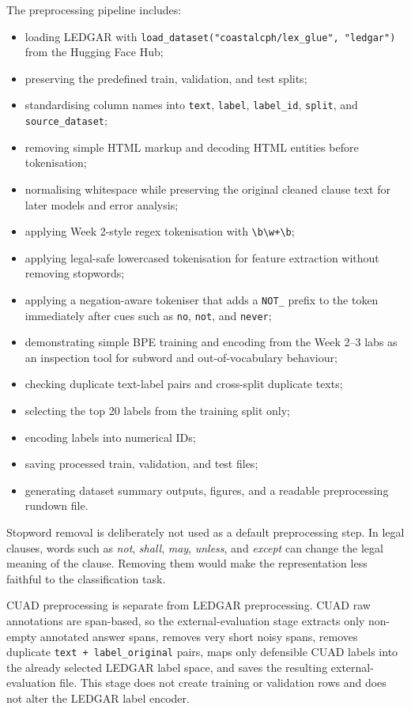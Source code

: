 \documentclass[11pt]{article}
\begin{document}
The preprocessing pipeline includes:

\begin{itemize}[leftmargin=*]
    \item loading LEDGAR with \texttt{load\_dataset("coastalcph/lex\_glue", "ledgar")} from the Hugging Face Hub;
    \item preserving the predefined train, validation, and test splits;
    \item standardising column names into \texttt{text}, \texttt{label}, \texttt{label\_id}, \texttt{split}, and \texttt{source\_dataset};
    \item removing simple HTML markup and decoding HTML entities before tokenisation;
    \item normalising whitespace while preserving the original cleaned clause text for later models and error analysis;
    \item applying Week 2-style regex tokenisation with \texttt{\textbackslash b\textbackslash w+\textbackslash b};
    \item applying legal-safe lowercased tokenisation for feature extraction without removing stopwords;
    \item applying a negation-aware tokeniser that adds a \texttt{NOT\_} prefix to the token immediately after cues such as \texttt{no}, \texttt{not}, and \texttt{never};
    \item demonstrating simple BPE training and encoding from the Week 2--3 labs as an inspection tool for subword and out-of-vocabulary behaviour;
    \item checking duplicate text-label pairs and cross-split duplicate texts;
    \item selecting the top 20 labels from the training split only;
    \item encoding labels into numerical IDs;
    \item saving processed train, validation, and test files;
    \item generating dataset summary outputs, figures, and a readable preprocessing rundown file.
\end{itemize}

Stopword removal is deliberately not used as a default preprocessing step. In legal clauses, words such as \textit{not}, \textit{shall}, \textit{may}, \textit{unless}, and \textit{except} can change the legal meaning of the clause. Removing them would make the representation less faithful to the classification task.

CUAD preprocessing is separate from LEDGAR preprocessing. CUAD raw annotations are span-based, so the external-evaluation stage extracts only non-empty annotated answer spans, removes very short noisy spans, removes duplicate \texttt{text + label\_original} pairs, maps only defensible CUAD labels into the already selected LEDGAR label space, and saves the resulting external-evaluation file. This stage does not create training or validation rows and does not alter the LEDGAR label encoder.
\end{document}
